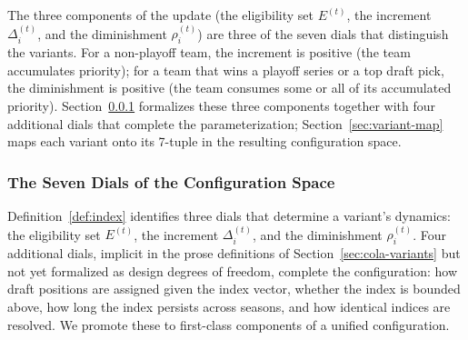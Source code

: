 
The three components of the update (the eligibility set $E^{(t)}$, the increment $\Delta_i^{(t)}$, and the diminishment $\rho_i^{(t)}$) are three of the seven dials that distinguish the variants. For a non-playoff team, the increment is positive (the team accumulates priority); for a team that wins a playoff series or a top draft pick, the diminishment is positive (the team consumes some or all of its accumulated priority). Section~\ref{sec:seven-dials} formalizes these three components together with four additional dials that complete the parameterization; Section~\ref{sec:variant-map} maps each variant onto its 7-tuple in the resulting configuration space.

\subsubsection{The Seven Dials of the \cola{} Configuration Space}
\label{sec:seven-dials}

Definition~\ref{def:index} identifies three dials that determine a variant's dynamics: the eligibility set $E^{(t)}$, the increment $\Delta_i^{(t)}$, and the diminishment $\rho_i^{(t)}$. Four additional dials, implicit in the prose definitions of Section~\ref{sec:cola-variants} but not yet formalized as design degrees of freedom, complete the configuration: how draft positions are assigned given the index vector, whether the index is bounded above, how long the index persists across seasons, and how identical indices are resolved. We promote these to first-class components of a unified configuration.

